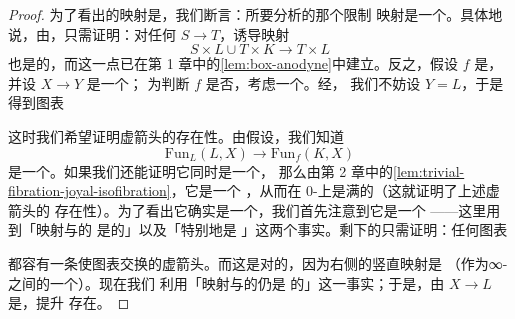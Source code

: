 \begin{proof}
为了看出\trRightAnodyne{}的映射是\trCofinal{}，我们断言：所要分析的那个限制
映射是一个\trTrivialFibration{}。具体地说，由\trAdjunction{}，只需证明：对任何%
\trMonomorphism{} $S \to T$，诱导映射
\[
S \times L \cup T \times K \longrightarrow T \times L
\]
也是\trRightAnodyne{}的，而这一点已在第 1 章中的\cref{lem:box-anodyne}中建立。反之，假设
$f$ 是\trCofinal{}\trMonomorphism{}，并设 $X \to Y$ 是一个\trRightFibration{}；
为判断 $f$ 是否\trRightAnodyne{}，考虑一个\trLiftingProblem{}。经\trPullback{}，
我们不妨设 $Y = L$，于是得到图表
\begin{center}
\end{center}
这时我们希望证明虚箭头的存在性。由假设，我们知道\trMorphism{}%
\[
\mathrm{Fun}_L(L, X) \to \mathrm{Fun}_f(K, X)
\]
是一个\trJoyalEquivalence{}。如果我们还能证明它同时是一个\trIsofibration{}，
那么由第 2 章中的\cref{lem:trivial-fibration-joyal-isofibration}，它是一个%
\trTrivialFibration{}，从而在 $0$-\trSimplex{}上是满的（这就证明了上述虚箭头的
存在性）。为了看出它确实是一个\trIsofibration{}，我们首先注意到它是一个%
\trInnerFibration{}——这里用到「\trInnerAnodyne{}映射与\trMonomorphism{}的%
\trPushoutProduct{}是\trInnerAnodyne{}的」以及「\trRightFibration{}特别地是%
\trInnerFibration{}」这两个事实。剩下的只需证明：任何图表
\begin{center}
\end{center}
都容有一条使图表交换的虚箭头。而这是对的，因为右侧的竖直映射是%
\trConservative{}（作为∞-\trGroupoid{}之间的一个\trFunctor{}）。现在我们
利用「\trRightAnodyne{}映射与\trMonomorphism{}的\trPushoutProduct{}仍是%
\trRightAnodyne{}的」这一事实；于是，由 $X \to L$ 是\trRightFibration{}，提升
存在。
\end{proof}

